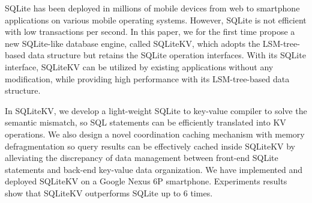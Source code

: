 SQLite has been deployed in millions of mobile devices from web to smartphone applications on various mobile operating systems. However, SQLite is not efficient with low transactions per second. In this paper, we for the first time propose a new SQLite-like database engine, called SQLiteKV, which adopts the LSM-tree-based data structure but retains the SQLite operation interfaces. With its SQLite interface, SQLiteKV can be utilized by existing applications without any modification, while providing high performance with its LSM-tree-based data structure.

In SQLiteKV, we develop a light-weight SQLite to key-value compiler to solve the semantic mismatch, so SQL statements can be efficiently translated into KV operations. We also design a novel coordination caching mechanism with memory defragmentation so query results can be effectively cached inside SQLiteKV by alleviating the discrepancy of data management between front-end SQLite statements and back-end key-value data organization. We have implemented and deployed SQLiteKV on a Google Nexus 6P smartphone. Experiments results show that SQLiteKV outperforms SQLite up to 6 times.